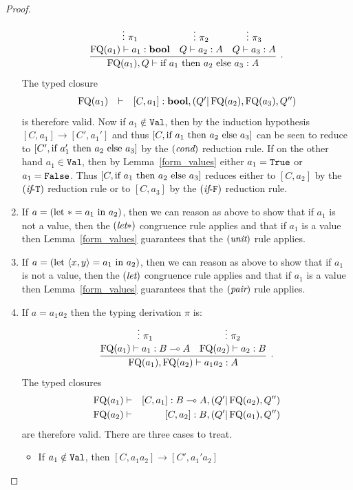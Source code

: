 \documentclass[twoside]{article}
\begin{document}
\begin{proof}
\begin{enumerate}
  \[
  \infer[.]{\FQ(a_1),Q\entails \ifthenelse{a_1}{a_2}{a_3}:A}{
    \deduce[]{\FQ(a_1)\entails a_1:\bool }{
      \vdots~\pi_1
    }
    &
    \deduce[]{Q \entails a_2:A}{
      \vdots~\pi_2
    }    
    &
    \deduce[]{Q \entails a_3:A}{
      \vdots~\pi_3
    }    
  }
  \]  
  The typed closure
  \[
  \begin{array}{rcl}
  \mathop{\textrm{FQ}}\nolimits(a_1) & \vdash & [C,a_1]:\textrm{\bf bool},(Q'|\mathop{\textrm{FQ}}\nolimits(a_2),\mathop{\textrm{FQ}}\nolimits(a_3),Q'')
  \end{array}
  \]
  is therefore valid. Now if $a_1\notin\mathtt{Val}$, then by the induction hypothesis 
  $[C,a_1]\to[C',a_1']$ and thus $[C,\textrm{\rm if}~ a_1 ~\textrm{\rm then}~ a_2 ~\textrm{\rm else}~ a_3]$ can
  be seen to reduce
  to $[C',\textrm{\rm if}~ a_1' ~\textrm{\rm then}~ a_2 ~\textrm{\rm else}~ a_3]$ by the $(\textit{cond})$ reduction rule. 
  If on the other hand $a_1\in\mathtt{Val}$, then by 
  Lemma~\hyperref[form_values]{\ref*{form_values}} either $a_1=\texttt{True}$ or $a_1=\texttt{False}$. 
  Thus $[C,\textrm{\rm if}~ a_1 ~\textrm{\rm then}~ a_2 ~\textrm{\rm else}~ a_3]$ reduces either to $[C,a_2]$ by the 
  $(\textit{if}\mbox{-}\mathtt{T})$ reduction rule or 
  to $[C,a_3]$ by the $(\textit{if}\mbox{-}\mathtt{F})$ reduction rule.
  \item If $a=(\textrm{\rm let}~ * = a_1 ~\textrm{\rm in}~ a_2)$, then we can reason as above to show that 
  if $a_1$ is not a value, then the $(\textit{let}*)$ congruence rule applies and that if 
  $a_1$ is a value then Lemma~\hyperref[form_values]{\ref*{form_values}} 
  guarantees that the $(\textit{unit})$ rule applies.   
  \item If $a=(\textrm{\rm let}~ \langle x,y\rangle = a_1 ~\textrm{\rm in}~ a_2)$, then we can reason as above to show that 
  if $a_1$ is not a value, then the $(\textit{let})$ congruence rule applies and that if 
  $a_1$ is a value then Lemma~\hyperref[form_values]{\ref*{form_values}} 
  guarantees that the $(\textit{pair})$ rule applies. 
  \item If $a=a_1a_2$ then the typing derivation $\pi$ is: 
  \[
    \infer[.]{\FQ(a_1),\FQ(a_2)\entails a_1a_2:A}{
      \deduce[]{\FQ(a_1)\entails a_1:B\loli A}{
        \vdots~\pi_1
      }
      &
      \deduce[]{\FQ(a_2)\entails a_2:B}{
        \vdots~\pi_2
      }      
    }
  \]  
  The typed closures
  \begin{eqnarray}
    \mathop{\textrm{FQ}}\nolimits(a_1) & \vdash & [C,a_1]:B\multimap A,(Q'|\mathop{\textrm{FQ}}\nolimits(a_2),Q'')\\
    \mathop{\textrm{FQ}}\nolimits(a_2) & \vdash & [C,a_2]:B, (Q'|\mathop{\textrm{FQ}}\nolimits(a_1),Q'')\label{eqn-fqa2}
  \end{eqnarray}
  are therefore valid. There are three cases to treat.
  \begin{itemize}
    \item If $a_1\notin\texttt{Val}$, then $[C,a_1a_2]\to[C',a_1'a_2]$

\end{itemize}
\end{enumerate}
\end{proof}
\end{document}
